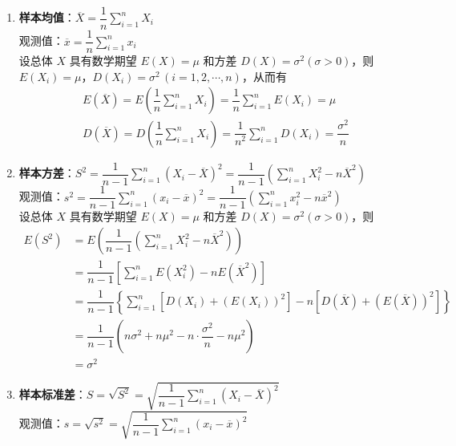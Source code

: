 \begin{enumerate}
    \item \textbf{样本均值}：$\overline{X} = \dfrac{1}{n} \displaystyle\sum_{i=1}^n X_i$ \\[0.5em]
    观测值：$\overline{x} = \dfrac{1}{n} \displaystyle\sum_{i=1}^n x_i$\\[0.5em]
    设总体 $X$ 具有数学期望 $E(X) = \mu$ 和方差 $D(X) = \sigma^2 (\sigma > 0)$，则 $E(X_i) = \mu$，$D(X_i) = \sigma^2 \, (i=1,2,\cdots,n)$，从而有
    $$
    \begin{aligned}
        & E(\overline{X}) = E(\dfrac{1}{n} \sum_{i=1}^n X_i) = \dfrac{1}{n} \sum_{i=1}^n E(X_i) = \mu \\
        & D(\overline{X}) = D(\dfrac{1}{n} \sum_{i=1}^n X_i) = \dfrac{1}{n^2} \sum_{i=1}^n D(X_i) = \dfrac{\sigma^2}{n}
    \end{aligned}
    $$

    \item \textbf{样本方差}：$S^2 = \dfrac{1}{n-1} \displaystyle\sum_{i=1}^n (X_i - \overline{X})^2 = \dfrac{1}{n-1} \left( \displaystyle\sum_{i=1}^n X_i^2 - n \overline{X}^2 \right)$ \\[0.5em]
    观测值：$s^2 = \dfrac{1}{n-1} \displaystyle\sum_{i=1}^n (x_i - \overline{x})^2 = \dfrac{1}{n-1} \left( \displaystyle\sum_{i=1}^n x_i^2 - n \overline{x}^2 \right)$ \\[0.5em]
    设总体 $X$ 具有数学期望 $E(X) = \mu$ 和方差 $D(X) = \sigma^2 (\sigma > 0)$，则
    $$
    \begin{aligned}
        E(S^2) &= E \left( \dfrac{1}{n-1} \left( \displaystyle\sum_{i=1}^n X_i^2 - n \overline{X}^2 \right) \right) \\
        &= \dfrac{1}{n-1} \left[ \displaystyle\sum_{i=1}^n E(X_i^2) - nE(\overline{X}^2) \right] \\
        &= \dfrac{1}{n-1} \left\{ \sum_{i=1}^n [D(X_i) + (E(X_i))^2] - n [D(\overline{X}) + (E(\overline{X}))^2] \right\} \\
        &= \dfrac{1}{n-1} \left( n \sigma^2 + n \mu^2 - n \cdot \dfrac{\sigma^2}{n} - n \mu^2 \right) \\
        &= \sigma^2
    \end{aligned}
    $$

    \item \textbf{样本标准差}：$S = \sqrt{S^2} = \sqrt{\dfrac{1}{n-1} \displaystyle\sum_{i=1}^n (X_i - \overline{X})^2}$ \\[0.5em]
    观测值：$s = \sqrt{s^2} = \sqrt{\dfrac{1}{n-1} \displaystyle\sum_{i=1}^n (x_i - \overline{x})^2}$


\end{enumerate}
